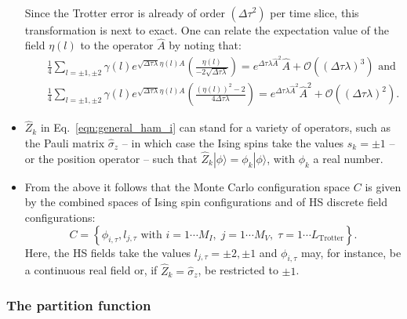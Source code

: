 \begin{itemize}
\begin{equation}
\begin{aligned}
\end{aligned}
\end{equation}
Since the Trotter error is already of order $(\Delta \tau ^2) $ per time slice, this transformation is next to exact.
One can relate the expectation value of the field $\eta(l)$ to the operator $\hat{A}$  by noting that:
\begin{eqnarray} 
    & &  \frac{1}{4} \sum_{l = \pm 1, \pm 2} \gamma(l) e^{\sqrt{ \Delta \tau \lambda} \eta(l) \hat{A}} \left( \frac{\eta(l)}{-2 \sqrt{ \Delta \tau \lambda}  } \right)    =   e^{ \Delta \tau \lambda  \hat{A}^2}  \hat{A}  +   \mathcal{O}  \left( (\Delta \tau \lambda)^3\right)   \text{  and } \nonumber \\  
     & &    \frac{1}{4} \sum_{l = \pm 1, \pm 2} \gamma(l) e^{\sqrt{ \Delta \tau \lambda} \eta(l) \hat{A}} \left( \frac{(\eta(l))^2 - 2}{4 \Delta \tau \lambda  } \right)    =   e^{ \Delta \tau \lambda  \hat{A}^2}  \hat{A}^2  +   \mathcal{O}  \left( (\Delta \tau \lambda)^2\right).
\end{eqnarray}
\item $\hat{Z}_k$ in Eq.~\ref{eqn:general_ham_i} can stand for a variety of operators, such as the Pauli matrix $\hat{\sigma}_{z}$ -- in which case the Ising spins take the values $s_{k} = \pm 1$ -- or the position operator -- such that $ \hat{Z}_k | \phi\rangle = \phi_k  |\phi\rangle $, with $\phi_k$ a real number.  

\item From the above it follows that the  Monte Carlo configuration space $C$  
is given by the combined spaces of Ising spin configurations  and of HS discrete field configurations:
\begin{equation}
	C = \left\{   \phi_{i,\tau} ,  l_{j,\tau}  \text{ with }  i=1\cdots M_I,\;  j = 1\cdots M_V,\; \tau=1\cdots L_{\mathrm{Trotter}}  \right\}.
\end{equation}
Here, the HS fields take the values $l_{j,\tau} = \pm 2, \pm 1 $ and  $\phi_{i,\tau}$ may, for instance, be a continuous real field or, if $\hat{Z}_k = \hat{\sigma}_{z}$, be restricted to $\pm 1$.
\end{itemize}

\subsubsection{The partition function}\label{sec:part}

